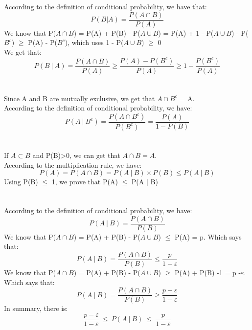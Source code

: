 \documentclass[10.5pt]{article}
\begin{document}
\section{}
According to the definition of conditional probability, we have that:
\begin{equation*}
    P(B|A) = \frac{P(A\cap B)}{P(A)}
\end{equation*}
\indent
We know that P($A\cap B$) = P(A) + P(B) - P($A\cup B$) = P(A) + 1 - P($A\cup B$) - P($B^c$) $\geq$ P(A) -  P($B^c$), which uses 1 - P($A\cup B$) $\geq$ 0\\
\indent
We get that:
\begin{equation*}
    P(B~|~A) = \frac{P(A\cap B)}{P(A)} \geq \frac{P(A)-P(B^c)}{P(A)} \geq 1-\frac{P(B^c)}{P(A)}
\end{equation*}

\section{}
Since A and B are mutually exclusive, we get that $A\cap B^c$ = A.\\
\indent
According to the definition of conditional probability, we have:
\begin{equation*}
    P(A~|~B^c) = \frac{P(A\cap B^c)}{P(B^c)} = \frac{P(A)}{1-P(B)}
\end{equation*}

\section{}
If $A\subset B$ and P(B)>0, we can get that $A\cap B = A$.\\
\indent
According to the multiplication rule, we have:
\begin{equation*}
    P(A) = P(A\cap B) = P(A~|~B)\times P(B)\leq P(A~|~B)
\end{equation*}
\indent
Using P(B) $\leq $ 1, we prove that P(A) $\leq$ P(A | B)\\

\section{}
According to the definition of conditional probability, we have:
\begin{equation*}
    P(A~|~B) = \frac{P(A\cap B)}{P(B)}
\end{equation*}
\indent
We know that P($A\cap B$) = P(A) + P(B) - P($A\cup B$) $ \leq $ P(A) = p. Which says that:
\begin{equation*}
    P(A~|~B) = \frac{P(A\cap B)}{P(B)} \leq \frac{p}{1-\varepsilon }
\end{equation*}
\indent
We know that P($A\cap B$) = P(A) + P(B) - P($A\cup B$) $\geq$ P(A) + P(B) -1 = p -$\varepsilon $. Which says that:
\begin{equation*}
    P(A~|~B) = \frac{P(A\cap B)}{P(B)} \geq \frac{p-\varepsilon }{1-\varepsilon }
\end{equation*}
\indent
In summary, there is:
\begin{equation*}
    \frac{p-\varepsilon }{1-\varepsilon }~\leq~ P(A~|~B) ~\leq~ \frac{p}{1-\varepsilon}
\end{equation*}
\end{document}
